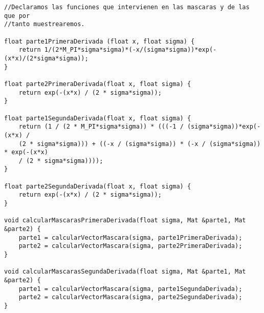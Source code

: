 \documentclass[10pt,a4paper]{article}
\begin{document}
\begin{lstlisting}
//Declaramos las funciones que intervienen en las mascaras y de las que por 
//tanto muestrearemos.

float parte1PrimeraDerivada (float x, float sigma) {
	return 1/(2*M_PI*sigma*sigma)*(-x/(sigma*sigma))*exp(-(x*x)/(2*sigma*sigma));
}

float parte2PrimeraDerivada(float x, float sigma) {
	return exp(-(x*x) / (2 * sigma*sigma));
}

float parte1SegundaDerivada(float x, float sigma) {
	return (1 / (2 * M_PI*sigma*sigma)) * (((-1 / (sigma*sigma))*exp(-(x*x) /
	(2 * sigma*sigma))) + ((-x / (sigma*sigma)) * (-x / (sigma*sigma)) * exp(-(x*x)
	/ (2 * sigma*sigma))));
}

float parte2SegundaDerivada(float x, float sigma) {
	return exp(-(x*x) / (2 * sigma*sigma));
}

void calcularMascarasPrimeraDerivada(float sigma, Mat &parte1, Mat &parte2) {
	parte1 = calcularVectorMascara(sigma, parte1PrimeraDerivada);
	parte2 = calcularVectorMascara(sigma, parte2PrimeraDerivada);
}

void calcularMascarasSegundaDerivada(float sigma, Mat &parte1, Mat &parte2) {
	parte1 = calcularVectorMascara(sigma, parte1SegundaDerivada);
	parte2 = calcularVectorMascara(sigma, parte2SegundaDerivada);
}
\end{lstlisting}
\end{document}
